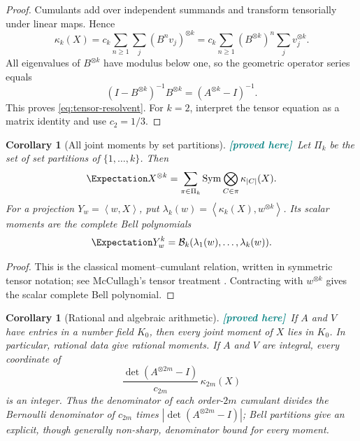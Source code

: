 \documentclass[11pt,oneside]{article}
\newtheorem{corollary}[theorem]{Corollary}
\theoremstyle{definition}
\theoremstyle{remark}
\newcommand{\Sym}{\operatorname{Sym}}
\newcommand{\ip}[2]{\left\langle #1,#2\right\rangle}
\newcommand{\New}{\textcolor{teal}{\textbf{[proved here]}}}
\begin{document}
\begin{proof}
Cumulants add over independent summands and transform tensorially under linear
maps.  Hence
\[
 \kappa_k(X)=c_k\sum_{n\ge1}\sum_j(B^nv_j)^{\otimes k}
 =c_k\sum_{n\ge1}(B^{\otimes k})^n\sum_jv_j^{\otimes k}.
\]
All eigenvalues of $B^{\otimes k}$ have modulus below one, so the geometric
operator series equals
\[
 (I-B^{\otimes k})^{-1}B^{\otimes k}
 =(A^{\otimes k}-I)^{-1}.
\]
This proves \eqref{eq:tensor-resolvent}.  For $k=2$, interpret the tensor equation
as a matrix identity and use $c_2=1/3$.
\end{proof}

\begin{corollary}[All joint moments by set partitions]
\label{cor:bell-moments}
\New\ Let $\Pi_k$ be the set of set partitions of $\{1,\ldots,k\}$.  Then
\begin{equation}
 \Expectation X^{\otimes k}
 =\sum_{\pi\in\Pi_k}\Sym
   \bigotimes_{C\in\pi}\kappa_{|C|}(X).
 \label{eq:set-partition-moments}
\end{equation}
For a projection $Y_w=\ip{w}{X}$, put
$\lambda_k(w)=\ip{\kappa_k(X)}{w^{\otimes k}}$.  Its scalar moments are the
complete Bell polynomials
\begin{equation}
 \Expectation Y_w^k=\mathcal B_k(\lambda_1(w),\ldots,\lambda_k(w)).
 \label{eq:bell-projection}
\end{equation}
\end{corollary}

\begin{proof}
This is the classical moment--cumulant relation, written in symmetric tensor
notation; see McCullagh's tensor treatment \cite{McCullagh}.  Contracting with
$w^{\otimes k}$ gives the scalar complete Bell polynomial.
\end{proof}

\begin{corollary}[Rational and algebraic arithmetic]
\label{cor:arithmetic}
\New\ If $A$ and $V$ have entries in a number field $K_0$, then every joint
moment of $X$ lies in $K_0$.  In particular, rational data give rational moments.
If $A$ and $V$ are integral, every coordinate of
\begin{equation}
 \frac{\det(A^{\otimes 2m}-I)}{c_{2m}}\,\kappa_{2m}(X)
 \label{eq:integer-adjugate}
\end{equation}
is an integer.  Thus the denominator of each order-$2m$ cumulant divides the
Bernoulli denominator of $c_{2m}$ times
$|\det(A^{\otimes 2m}-I)|$; Bell partitions give an explicit, though generally
non-sharp, denominator bound for every moment.
\end{corollary}
\end{document}
